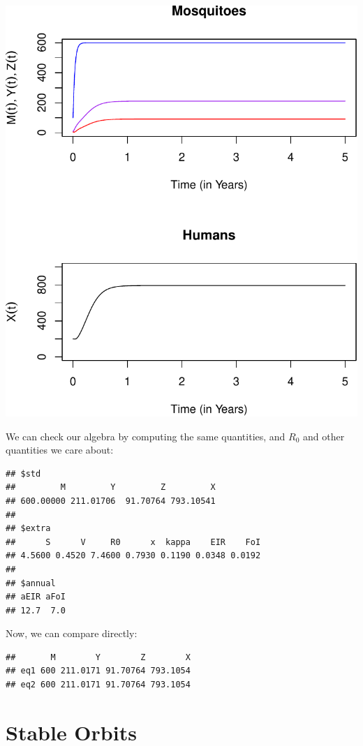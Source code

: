 \documentclass[
]{book}
\begin{document}
\includegraphics{docs/figs/unnamed-chunk-79-1.pdf}

We can check our algebra by computing the same quantities, and \(R_0\) and other quantities we care about:

\begin{verbatim}
## $std
##         M         Y         Z         X 
## 600.00000 211.01706  91.70764 793.10541 
## 
## $extra
##      S      V     R0      x  kappa    EIR    FoI 
## 4.5600 0.4520 7.4600 0.7930 0.1190 0.0348 0.0192 
## 
## $annual
## aEIR aFoI 
## 12.7  7.0
\end{verbatim}

Now, we can compare directly:

\begin{verbatim}
##       M        Y        Z        X
## eq1 600 211.0171 91.70764 793.1054
## eq2 600 211.0171 91.70764 793.1054
\end{verbatim}

\section{Stable Orbits}\label{stable-orbits}
\end{document}

